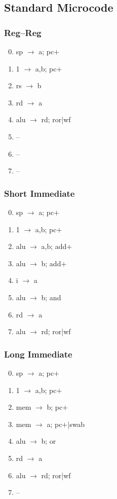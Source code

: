 \documentclass[11pt]{book}
\begin{document}
\subsection*{Standard Microcode}
\begin{multicols}{3}\ttfamily\selectfont\small
  \subsubsection*{Reg--Reg}
  \begin{enumerate}\setcounter{enumi}{-1}
  \item sp \(\rightarrow\) a; pc\(+\)
  \item 1 \(\rightarrow\) a,b; pc\(+\)
  \item rs \(\rightarrow\) b
  \item rd \(\rightarrow\) a
  \item alu \(\rightarrow\) rd; ror|wf
  \item --
  \item --
  \item --
  \end{enumerate}
  \columnbreak
  \subsubsection*{Short Immediate}
  \begin{enumerate}\setcounter{enumi}{-1}
  \item sp \(\rightarrow\) a; pc\(+\)
  \item 1 \(\rightarrow\) a,b; pc\(+\)
  \item alu \(\rightarrow\) a,b; add+
  \item alu \(\rightarrow\) b; add+
  \item i \(\rightarrow\) a
  \item alu \(\rightarrow\) b; and
  \item rd \(\rightarrow\) a
  \item alu \(\rightarrow\) rd; ror|wf
  \end{enumerate}
  \columnbreak
  \subsubsection*{Long Immediate}
  \begin{enumerate}\setcounter{enumi}{-1}
  \item sp \(\rightarrow\) a; pc\(+\)
  \item 1 \(\rightarrow\) a,b; pc\(+\)
  \item mem \(\rightarrow\) b; pc\(+\)
  \item mem \(\rightarrow\) a; pc\(+\)|swab
  \item alu \(\rightarrow\) b; or
  \item rd \(\rightarrow\) a
  \item alu \(\rightarrow\) rd; ror|wf
  \item --
  \end{enumerate}
\end{multicols}
\end{document}
